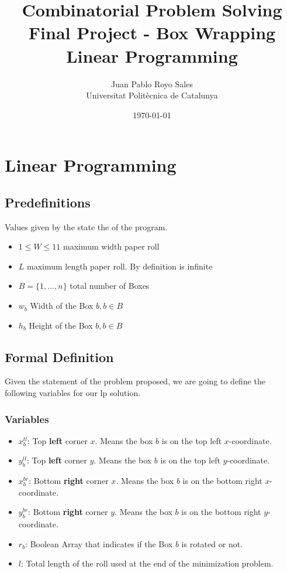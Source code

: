 \documentclass[12pt, a4paper]{article}
\title{%
      Combinatorial Problem Solving \\
      Final Project - Box Wrapping \\
      Linear Programming
}
\author{%
  Juan Pablo Royo Sales \\
  \small{Universitat Politècnica de Catalunya}
}
\date\today
\begin{document}
\maketitle

\section{Linear Programming}

\subsection{Predefinitions}
Values given by the state the of the program.

\begin{itemize}
  \item $1 \leq W \leq 11$ maximum width paper roll
  \item $L$ maximum length paper roll. By definition is infinite
  \item $B = \{1, \dots, n\}$ total number of Boxes
  \item $w_b$ Width of the Box $b, b \in B$
  \item $h_b$ Height of the Box $b, b \in B$
\end{itemize}

\subsection{Formal Definition}
Given the statement of the problem proposed, we are going to define the following variables for our \acrfull{lp} solution.

\subsubsection{Variables}
\begin{itemize}
  \item $x_b^{tl}$: Top \textbf{left} corner $x$. Means the box $b$ is on the top left $x$-coordinate.
  \item $y_b^{tl}$: Top \textbf{left} corner $y$. Means the box $b$ is on the top left $y$-coordinate.
  \item $x_b^{br}$: Bottom \textbf{right} corner $x$. Means the box $b$ is on the bottom right $x$-coordinate.
  \item $y_b^{br}$: Bottom \textbf{right} corner $y$. Means the box $b$ is on the bottom right $y$-coordinate.
  \item $r_b$: Boolean Array that indicates if the Box $b$ is rotated or not.
  \item $l$: Total length of the roll used at the end of the minimization problem.
\end{itemize}
\end{document}
